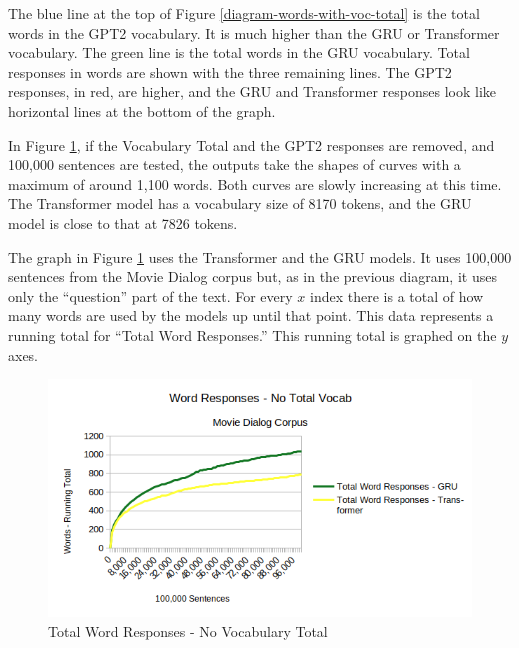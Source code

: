The blue line at the top of Figure \ref{diagram-words-with-voc-total} is the total words in the GPT2 vocabulary. It is much higher than the GRU or Transformer vocabulary.
The green line is the total words in the GRU vocabulary. Total responses in words are shown with the three remaining lines. The GPT2 responses, in red, are higher, and the GRU and Transformer responses look like horizontal lines at the bottom of the graph.

In Figure \ref{diagram-words-no-voc-total}, if the Vocabulary Total and the GPT2 responses are removed, and 100,000 sentences are tested, the outputs take the shapes of curves with a maximum of around 1,100 words. Both curves are slowly increasing at this time. The Transformer model has a vocabulary size of 8170 tokens, and the GRU model is close to that at 7826 tokens.

The graph in Figure \ref{diagram-words-no-voc-total} uses the Transformer and the GRU models. It uses 100,000 sentences from the Movie Dialog corpus but, as in the previous diagram, it uses only the ``question'' part of the text. For every $x$ index there is a total of how many words are used by the models up until that point. This data represents a running total for ``Total Word Responses.'' This running total is graphed on the $y$ axes. 

\begin{figure}[H]
	\begin{center}
		\includegraphics[scale=0.75]{diagram-100000-novocab}
		
		
	\end{center}
	\caption[Total Word Responses]{Total Word Responses - No Vocabulary Total}
	\label{diagram-words-no-voc-total}
	
\end{figure}

